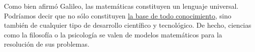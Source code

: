 \documentclass{article}
\begin{document}
 Como bien afirmó Galileo, las matemáticas constituyen un lenguaje universal.
 Podríamos decir que no sólo constituyen \underline{la base de todo
 conocimiento}, sino también de cualquier tipo de desarrollo científico y
 tecnológico.
  De hecho, ciencias como la filosofía o la 
 psicología se valen de modelos matemáticos para la resolución de sus
problemas.
\end{document}
